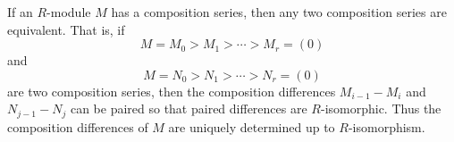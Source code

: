 If an $R$-module $M$ has a composition series, then any two composition series are equivalent. That is, if
$$M = M_0 > M_1 > \cdots > M_r = (0)$$
and
$$M = N_0 > N_1 > \cdots > N_r = (0)$$
are two composition series, then the composition differences $M_{i-1} - M_i$ and $N_{j-1} - N_j$ can be paired so that paired differences are $R$-isomorphic. Thus the composition differences of $M$ are uniquely determined up to $R$-isomorphism.
